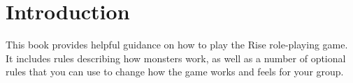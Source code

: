 \chapter{Introduction}

This book provides helpful guidance on how to play the Rise role-playing game.
It includes rules describing how monsters work, as well as a number of optional rules that you can use to change how the game works and feels for your group.

